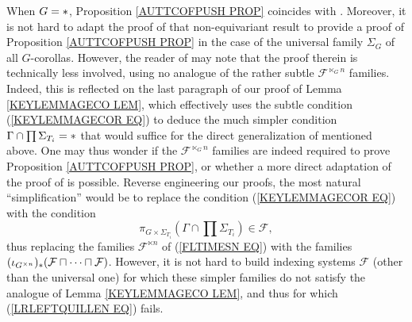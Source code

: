 \documentclass[a4paper,10pt]{article}%
\begin{document}
\begin{remark}
When $G=\**$, Proposition \ref{AUTTCOFPUSH PROP}
coincides with \cite[Lemma 5.9]{BM08}.
Moreover, it is not hard to adapt the proof of that non-equivariant result to provide a proof of Proposition \ref{AUTTCOFPUSH PROP} in the case of the universal family $\Sigma_G$ of all $G$-corollas.
However, the reader of \cite{BM08} may note that the proof therein is technically less involved, using no analogue of the rather subtle $\mathcal{F}^{\ltimes_G n}$ families.
Indeed, this is reflected 
on the last paragraph of our proof of Lemma \ref{KEYLEMMAGECO LEM}, which effectively 
uses the subtle condition (\ref{KEYLEMMAGECOR EQ})
to deduce the much simpler condition
$\Gamma \cap \prod \Sigma_{T_i} = \**$
that would suffice for the direct generalization of \cite[Lemma 5.9]{BM08} mentioned above.
One may thus wonder if the $\mathcal{F}^{\ltimes_G n}$
families are indeed required 
to prove Proposition \ref{AUTTCOFPUSH PROP},
or whether a more direct adaptation of the proof of \cite[Lemma 5.9]{BM08} is possible.
Reverse engineering our proofs, the most natural ``simplification'' would be to replace the condition (\ref{KEYLEMMAGECOR EQ}) with the condition
\begin{equation}\label{WRONGCONJ}
\pi_{G \times \Sigma_{T_i}}(\Gamma \cap \prod \Sigma_{T_i})
\in   \mathcal{F},
\end{equation}
thus replacing the families 
$\mathcal{F}^{\ltimes n}$ of (\ref{FLTIMESN EQ}) with the families
$(\iota_{G^{\times n}})_{\**}
(\mathcal{F} \sqcap \cdots \sqcap \mathcal{F})$.
However, it is not hard to build indexing systems $\mathcal{F}$ (other than the universal one) for which these simpler families do not satisfy the analogue of 
Lemma \ref{KEYLEMMAGECO LEM}, 
and thus for which (\ref{LRLEFTQUILLEN EQ}) fails.

\end{remark}
\end{document}
